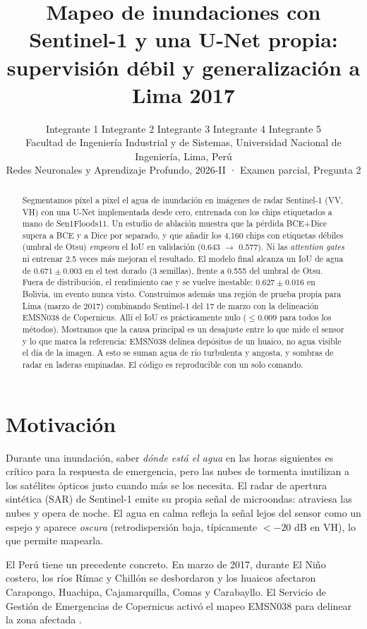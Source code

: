 \documentclass{article}
\title{Mapeo de inundaciones con Sentinel-1 y una U-Net propia:\\
supervisión débil y generalización a Lima 2017}
\author{%
  Integrante 1 \And Integrante 2 \And Integrante 3 \And Integrante 4 \And Integrante 5 \\
  Facultad de Ingeniería Industrial y de Sistemas, Universidad Nacional de Ingeniería, Lima, Perú \\
  Redes Neuronales y Aprendizaje Profundo, 2026-II · Examen parcial, Pregunta 2
}
\begin{document}
\maketitle

\begin{abstract}
Segmentamos píxel a píxel el agua de inundación en imágenes de radar Sentinel-1 (VV, VH) con una U-Net implementada desde cero, entrenada con los chips etiquetados a mano de Sen1Floods11. Un estudio de ablación muestra que la pérdida BCE+Dice supera a BCE y a Dice por separado, y que añadir los 4,160 chips con etiquetas débiles (umbral de Otsu) \emph{empeora} el IoU en validación (0.643 $\rightarrow$ 0.577). Ni las \emph{attention gates} ni entrenar 2.5 veces más mejoran el resultado. El modelo final alcanza un IoU de agua de $0.671 \pm 0.003$ en el test dorado (3 semillas), frente a 0.555 del umbral de Otsu. Fuera de distribución, el rendimiento cae y se vuelve inestable: $0.627 \pm 0.016$ en Bolivia, un evento nunca visto. Construimos además una región de prueba propia para Lima (marzo de 2017) combinando Sentinel-1 del 17 de marzo con la delineación EMSN038 de Copernicus. Allí el IoU es prácticamente nulo ($\leq 0.009$ para todos los métodos). Mostramos que la causa principal es un desajuste entre lo que mide el sensor y lo que marca la referencia: EMSN038 delinea depósitos de un huaico, no agua visible el día de la imagen. A esto se suman agua de río turbulenta y angosta, y sombras de radar en laderas empinadas. El código es reproducible con un solo comando.
\end{abstract}

\section{Motivación}

Durante una inundación, saber \emph{dónde está el agua} en las horas siguientes es crítico para la respuesta de emergencia, pero las nubes de tormenta inutilizan a los satélites ópticos justo cuando más se los necesita. El radar de apertura sintética (SAR) de Sentinel-1 \citep{torres2012} emite su propia señal de microondas: atraviesa las nubes y opera de noche. El agua en calma refleja la señal lejos del sensor como un espejo y aparece \emph{oscura} (retrodispersión baja, típicamente $< -20$ dB en VH), lo que permite mapearla.

El Perú tiene un precedente concreto. En marzo de 2017, durante El Niño costero, los ríos Rímac y Chillón se desbordaron y los huaicos afectaron Carapongo, Huachipa, Cajamarquilla, Comas y Carabayllo. El Servicio de Gestión de Emergencias de Copernicus activó el mapeo EMSN038 para delinear la zona afectada \citep{emsn038}.
\end{document}
